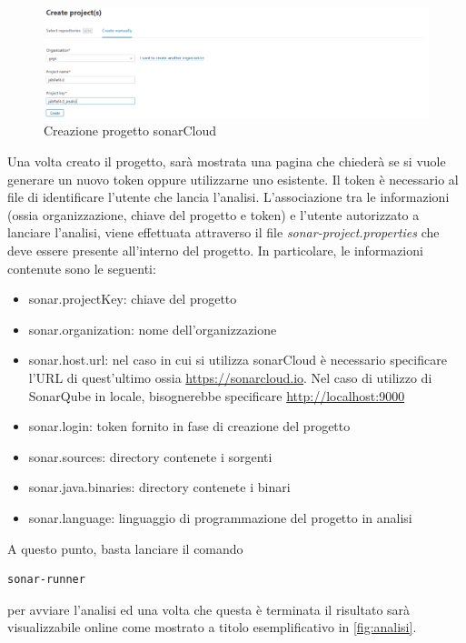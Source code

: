 \begin{figure}[htbp]
	\centering
	\includegraphics[scale=0.3, trim = 0cm 0cm 0cm 0cm, clip=true]{figSonarCloud/progetto.PNG}
	\caption{Creazione progetto sonarCloud}
	\label{fig:prog}
\end{figure}
Una volta creato il progetto, sarà mostrata una pagina che chiederà se si vuole generare un nuovo token oppure utilizzarne uno esistente. Il token è necessario al file di identificare l'utente che lancia l'analisi. L'associazione tra le informazioni (ossia organizzazione, chiave del progetto e token) e l'utente autorizzato a lanciare l'analisi, viene effettuata attraverso il file \textit{sonar-project.properties} che deve essere presente all'interno del progetto. In particolare, le informazioni contenute sono le seguenti:
\begin{itemize}
	\item 	sonar.projectKey: chiave del progetto
	\item 	sonar.organization: nome dell'organizzazione
	\item 	sonar.host.url: nel caso in cui si utilizza sonarCloud è necessario specificare l'URL di quest'ultimo ossia \url{https://sonarcloud.io}. Nel caso di utilizzo di SonarQube in locale, bisognerebbe specificare \url{http://localhost:9000}
	\item 	sonar.login: token fornito in fase di creazione del progetto
	\item sonar.sources: directory contenete i sorgenti
	\item sonar.java.binaries: directory contenete i binari
	\item sonar.language: linguaggio di programmazione del progetto in analisi
\end{itemize}

A questo punto, basta lanciare il comando 
\begin{verbatim}
sonar-runner
\end{verbatim}
per avviare l'analisi ed una volta che questa è terminata il risultato sarà visualizzabile online come mostrato a titolo esemplificativo in \autoref{fig:analisi}.
	
